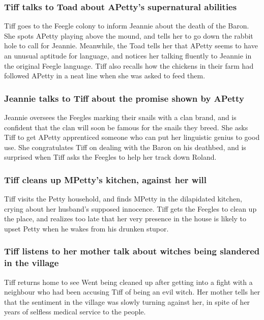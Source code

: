 \subsubsection{\Gls{Tiff} talks to \Gls{Toad} about \Gls{APetty}'s supernatural abilities}
\Gls{Tiff} goes to the Feegle colony to inform \Gls{Jeannie} about the death of the \Gls{Baron}. She
spots \Gls{APetty} playing above the mound, and tells her to go down the rabbit hole to call for
\Gls{Jeannie}. Meanwhile, the \Gls{Toad} tells her that \Gls{APetty} seems to have an unusual
aptitude for language, and notices her talking fluently to \Gls{Jeannie} in the original Feegle
language. \Gls{Tiff} also recalls how the chickens in their farm had followed \Gls{APetty} in a neat
line when she was asked to feed them.

\subsubsection{\Gls{Jeannie} talks to \Gls{Tiff} about the promise shown by \Gls{APetty}}
\Gls{Jeannie} oversees the Feegles marking their snails with a clan brand, and is confident that
the clan will soon be famous for the snails they breed. She asks \Gls{Tiff} to get \Gls{APetty}
apprenticed someone who can put her linguistic genius to good use. She congratulates \Gls{Tiff} on
dealing with the \Gls{Baron} on his deathbed, and is surprised when \Gls{Tiff} asks the Feegles to
help her track down \Gls{Roland}.

\subsubsection{\Gls{Tiff} cleans up \Gls{MPetty}'s kitchen, against her will}
\Gls{Tiff} visits the Petty household, and finds \Gls{MPetty} in the dilapidated kitchen, crying
about her husband's supposed innocence. \Gls{Tiff} gets the Feegles to clean up the place, and
realizes too late that her very presence in the house is likely to upset \Gls{Petty} when he wakes
from his drunken stupor.

\subsubsection{\Gls{Tiff} listens to her mother talk about witches being slandered in the village}
\Gls{Tiff} returns home to see \Gls{Went} being cleaned up after getting into a fight with a
neighbour who had been accusing \Gls{Tiff} of being an evil witch. Her mother tells her that the
sentiment in the village was slowly turning against her, in spite of her years of selfless medical
service to the people.

